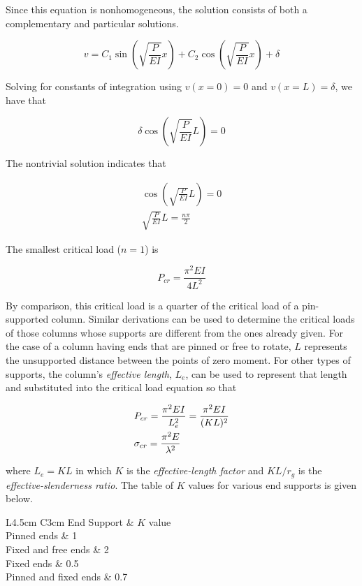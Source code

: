 \documentclass[a4paper,openany,12pt]{book}
\begin{document}
{{Since this equation is nonhomogeneous, the solution consists of both a
complementary and particular solutions.

$$v = C_1\sin \left( \sqrt {\frac{P}{EI}} x \right) + C_2\cos \left( \sqrt {\frac{P}{EI}} x \right) + \delta$$

Solving for constants of integration using \(v(x = 0) = 0\) and
\(v(x = L) = \delta\), we have that

$$\delta \cos \left( \sqrt {\frac{P}{EI}} L \right) = 0$$

The nontrivial solution indicates that

$$\begin{gathered}
  \cos \left( \sqrt {\frac{P}{EI}} L \right) = 0 \\
  \sqrt {\frac{P}{EI}} L = \frac{n\pi }{2}\end{gathered}$$

The smallest critical load (\(n = 1\)) is

$$P_{cr} = \frac{\pi^2EI}{4L^2}$$

By comparison, this critical load is a quarter of the critical load of a
pin-supported column. Similar derivations can be used to determine the
critical loads of those columns whose supports are different from the
ones already given. For the case of a column having ends that are pinned
or free to rotate, \(L\) represents the unsupported distance between the
points of zero moment. For other types of supports, the column's
\emph{effective length}, \(L_e\), can be used to represent that length and
substituted into the critical load equation so that

\begin{gather}
\label{eq:org27c0055}
  P_{cr} = \frac{\pi^2EI}{L_e^2} = \frac{\pi ^2EI}{(KL)^2} \hfill \\
  \sigma_{cr} = \frac{\pi ^2E}{\lambda^2} \hfill \\ 
\end{gather}

where \(L_e = KL\) in which \(K\) is the \emph{effective-length factor} and
\(KL/r_g\) is the \emph{effective-slenderness ratio}. The table of \(K\) values
for various end supports is given below.


 L4.5cm C3cm End Support \& \(K\) value\\
Pinned ends \& 1\\
Fixed and free ends \& 2\\
Fixed ends \& 0.5\\
Pinned and fixed ends \& 0.7\\

}}
\end{document}
